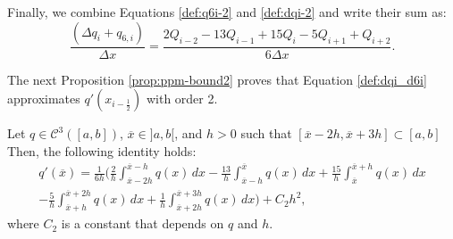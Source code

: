 Finally, we combine Equations \eqref{def:q6i-2} and \eqref{def:dqi-2} and write their sum as:
\begin{equation} 
	\label{def:dqi_d6i}
	\frac{(\Delta q_i + q_{6, i})}{\Delta x} = 
	\frac{2Q_{i-2}-13Q_{i-1} +15Q_i -5Q_{i+1} + Q_{i+2}}{6\Delta x}.
\end{equation}

The next Proposition \ref{prop:ppm-bound2} proves that Equation \eqref{def:dqi_d6i}
approximates $q'(x_{i-\frac{1}{2}})$ with order 2.
\begin{prop}
	\label{prop:ppm-bound2}
	Let $q \in \mathcal{C}^{3}([a,b])$, $\overline{x}\in ]a,b[$,
	and $h>0$ such that $[\overline{x}-2h,\overline{x}+3h] \subset [a,b]$
	Then, the following identity holds:
	\begin{equation}
		\begin{split}
		\label{prop:ppm-bound2-eq1}
		q'(\overline{x} ) = \frac{1}{6h}
		\bigg( \frac{2}{h} \int_{\overline{x}-2h}^{\overline{x}-h} q(x) \,dx 
		      -\frac{13}{h}\int_{\overline{x}-h}^{\overline{x}} q(x) \,dx   
		      +\frac{15}{h}\int_{\overline{x}}^{\overline{x}+h} q(x) \,dx  \\ 
		      -\frac{5}{h} \int_{\overline{x}+h}^{\overline{x}+2h} q(x) \,dx   
		      +\frac{1}{h} \int_{\overline{x}+2h}^{\overline{x}+3h} q(x) \,dx   
		\bigg) + C_2h^2,
		\end{split}
	\end{equation}
	where $C_2$ is a constant that depends on $q$ and $h$.
\end{prop}

